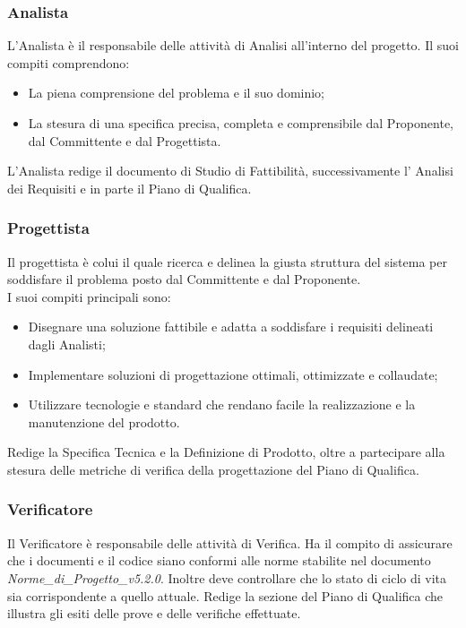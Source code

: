 \subsubsection{Analista}

L'Analista è il responsabile delle attivit\`{a} di Analisi all'interno del progetto. Il suoi compiti comprendono:
\begin{itemize}
\item La piena comprensione del problema e il suo dominio;
\item La stesura di una specifica precisa, completa e comprensibile dal Proponente, dal Committente e dal Progettista.
\end{itemize}
L'Analista redige il documento di Studio di Fattibilità, successivamente l' Analisi dei Requisiti e in parte il Piano di Qualifica.

\subsubsection{Progettista}

Il progettista è colui il quale ricerca e delinea la giusta struttura del sistema per soddisfare il problema posto dal Committente e dal Proponente.\\
I suoi compiti principali sono:
\begin{itemize}
\item Disegnare una soluzione fattibile e adatta a soddisfare i requisiti delineati dagli Analisti;
\item Implementare soluzioni di progettazione ottimali, ottimizzate e collaudate;
\item Utilizzare tecnologie e standard che rendano facile la realizzazione e la manutenzione del prodotto.
\end{itemize}
Redige la Specifica Tecnica e la Definizione di Prodotto, oltre a partecipare alla stesura delle metriche di verifica della progettazione del Piano di Qualifica.

\subsubsection{Verificatore}

Il Verificatore è responsabile delle attivit\`{a} di Verifica. Ha il compito di assicurare che i documenti e il codice siano conformi alle norme stabilite nel documento \emph{Norme\_di\_Progetto\_v5.2.0}. Inoltre deve controllare che lo stato di ciclo di vita sia corrispondente a quello attuale.
Redige la sezione del Piano di Qualifica che illustra gli esiti delle prove e delle verifiche effettuate.

